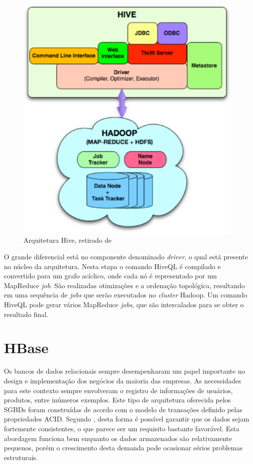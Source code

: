 \begin{figure}[ht!]
	\centering
	\includegraphics[keepaspectratio=true,scale=0.5]
	  {figuras/hive.eps}
	\caption{Arquitetura Hive, retirado de 
	}
	\label{fig-hive}
\end{figure}
\FloatBarrier

O grande diferencial está no componente denominado \textit{driver}, o qual está presente no núcleo da arquitetura. Nesta etapa o comando HiveQL é compilado e convertido para um grafo acíclico, onde cada nó é representado por um MapReduce \textit{job}. São realizadas otimizações e a ordenação topológica, resultando em uma sequência de \textit{jobs} que serão executados no \textit{cluster} Hadoop. Um comando HiveQL pode gerar vários MapReduce \textit{jobs}, que são intercalados para se obter o resultado final.


\section{HBase}

Os bancos de dados relacionais sempre desempenharam um papel importante no design e implementação dos negócios da maioria das empresas. As necessidades para este contexto sempre envolveram o registro de informações de usuários, produtos, entre inúmeros exemplos. Este tipo de arquitetura oferecida pelos SGBDs foram construídas de acordo com o modelo de transações definido pelas propriedades ACID. Segundo , desta forma é possível garantir que os dados sejam fortemente consistentes, o que parece ser um requisito bastante favorável. Esta abordagem funciona bem enquanto os dados armazenados são relativamente pequenos, porém o crescimento desta demanda pode ocasionar sérios problemas estruturais.

